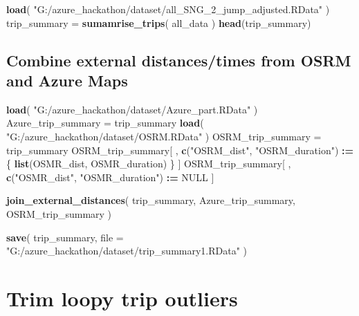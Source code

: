 \documentclass[]{article}
\newenvironment{Shaded}{\begin{snugshade}}{\end{snugshade}}
\newcommand{\DataTypeTok}[1]{\textcolor[rgb]{0.13,0.29,0.53}{#1}}
\newcommand{\ErrorTok}[1]{\textcolor[rgb]{0.64,0.00,0.00}{\textbf{#1}}}
\newcommand{\KeywordTok}[1]{\textcolor[rgb]{0.13,0.29,0.53}{\textbf{#1}}}
\newcommand{\NormalTok}[1]{#1}
\newcommand{\OperatorTok}[1]{\textcolor[rgb]{0.81,0.36,0.00}{\textbf{#1}}}
\newcommand{\OtherTok}[1]{\textcolor[rgb]{0.56,0.35,0.01}{#1}}
\newcommand{\StringTok}[1]{\textcolor[rgb]{0.31,0.60,0.02}{#1}}
\begin{document}
\begin{Shaded}
\begin{Highlighting}[]
\KeywordTok{load}\NormalTok{( }\StringTok{"G:/azure_hackathon/dataset/all_SNG_2_jump_adjusted.RData"}\NormalTok{ )}
\NormalTok{trip_summary =}\StringTok{ }\KeywordTok{sumamrise_trips}\NormalTok{( all_data )}
\KeywordTok{head}\NormalTok{(trip_summary)}
\end{Highlighting}
\end{Shaded}

\hypertarget{combine-external-distancestimes-from-osrm-and-azure-maps}{%
\subsection{Combine external distances/times from OSRM and Azure
Maps}\label{combine-external-distancestimes-from-osrm-and-azure-maps}}

\begin{Shaded}
\begin{Highlighting}[]
\KeywordTok{load}\NormalTok{( }\StringTok{"G:/azure_hackathon/dataset/Azure_part.RData"}\NormalTok{ )}
\NormalTok{Azure_trip_summary =}\StringTok{ }\NormalTok{trip_summary}
\KeywordTok{load}\NormalTok{( }\StringTok{"G:/azure_hackathon/dataset/OSRM.RData"}\NormalTok{ )}
\NormalTok{OSRM_trip_summary =}\StringTok{ }\NormalTok{trip_summary}
\NormalTok{OSRM_trip_summary[ , }\KeywordTok{c}\NormalTok{(}\StringTok{"OSRM_dist"}\NormalTok{, }\StringTok{"OSRM_duration"}\NormalTok{) }\OperatorTok{:}\ErrorTok{=}\StringTok{ }\NormalTok{\{}
    \KeywordTok{list}\NormalTok{(OSMR_dist, OSMR_duration)}
\NormalTok{\} ]}
\NormalTok{OSRM_trip_summary[ , }\KeywordTok{c}\NormalTok{(}\StringTok{"OSMR_dist"}\NormalTok{, }\StringTok{"OSMR_duration"}\NormalTok{) }\OperatorTok{:}\ErrorTok{=}\StringTok{ }\OtherTok{NULL}\NormalTok{ ]}

\KeywordTok{join_external_distances}\NormalTok{( trip_summary, Azure_trip_summary, OSRM_trip_summary )}

\KeywordTok{save}\NormalTok{( trip_summary, }\DataTypeTok{file =} \StringTok{"G:/azure_hackathon/dataset/trip_summary1.RData"}\NormalTok{ )}
\end{Highlighting}
\end{Shaded}

\hypertarget{trim-loopy-trip-outliers}{%
\section{Trim loopy trip outliers}\label{trim-loopy-trip-outliers}}
\end{document}
